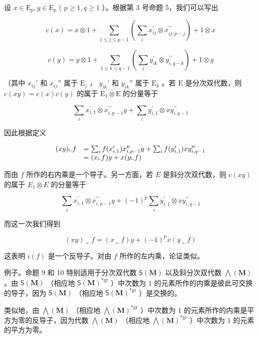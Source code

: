 设 \(x \in \mathrm{E}_p, y \in \mathrm{E}_p\) ( \(p \geqslant 1, q \geqslant 1\) ）。根据第 3 号命题 5，我们可以写出

\[
c (x) = x \otimes 1 + \sum_ {1 \leqslant j \leqslant p - 1} \left(\sum_ {i} x _ {i j} ^ {\prime} \otimes x _ {i j, p - j} ^ {\prime \prime}\right) + 1 \otimes x
\]

\[
c (y) = y \otimes 1 + \sum_ {1 \leqslant k \leqslant q - 1} \left(\sum_ {i} y _ {i k} ^ {\prime} \otimes y _ {i, q - k} ^ {\prime \prime}\right) + 1 \otimes y
\]

（其中 \(x_{ij}'\) 和 \(x_{ij}''\) 属于 \(\mathrm{E}_j\) ， \(y_{ik}'\) 和 \(y_{ik}''\) 属于 \(\mathrm{E}_k\) 。若 \(\mathrm{E}\) 是分次双代数，则 \(c(xy) = c(x)c(y)\) 的属于 \(\mathrm{E}_1 \otimes \mathrm{E}\) 的分量等于

\[
\sum_ {i} x _ {i, 1} ^ {\prime} \otimes x _ {i, p - 1} ^ {\prime \prime} y + \sum_ {i} y _ {i, 1} ^ {\prime} \otimes x y _ {i, q - 1} ^ {\prime \prime}
\]

因此根据定义

\[
\begin{array}{r l} (x y) \llcorner f & = \sum_ {i} f (x _ {i, 1} ^ {\prime}) x _ {i, p - 1} ^ {\prime \prime} y + \sum_ {i} f (y _ {i, 1} ^ {\prime}) x y _ {i, q - 1} ^ {\prime \prime} \\ & = (x \llcorner f) y + x (y \llcorner f) \end{array}
\]

而由 \(f\) 所作的右内乘是一个导子。另一方面，若 \(E\) 是斜分次双代数，则 \(c(xy)\) 的属于 \(E_1 \otimes E\) 的分量等于

\[
\sum_ {i} x _ {i, 1} ^ {\prime} \otimes x _ {i, p - 1} ^ {\prime \prime} y + (- 1) ^ {p} \sum_ {i} y _ {i, 1} ^ {\prime} \otimes x y _ {i, q - 1} ^ {\prime \prime}
\]

而这一次我们得到

\[
(x y) \llcorner f = (x \llcorner f) y + (- 1) ^ {p} x (y \llcorner f)
\]

这表明 \(i(f)\) 是一个反导子。对由 \(f\) 所作的左内乘，论证类似。

例子。命题 9 和 10 特别适用于分次双代数 \(\mathsf{S}(\mathbf{M})\) 以及斜分次双代数 \(\bigwedge (\mathbf{M})\) 。由 \(\mathsf{S}(\mathbf{M})\) （相应地 \(\mathsf{S}(\mathbf{M})^{*\mathrm{gr}}\) ）中次数为 1 的元素所作的内乘是彼此可交换的导子，因为 \(\mathsf{S}(\mathbf{M})\) （相应地 \(\mathsf{S}(\mathbf{M})^{*\mathrm{gr}}\) ）是交换的。

类似地，由 \(\bigwedge (\mathbf{M})\) （相应地 \(\bigwedge (\mathbf{M})^{*\mathrm{gr}}\) ）中次数为 1 的元素所作的内乘是平方为零的反导子，因为代数 \(\bigwedge (\mathbf{M})\) （相应地 \(\bigwedge (\mathbf{M})^{*\mathrm{gr}}\) ）中次数为 1 的元素的平方为零。

